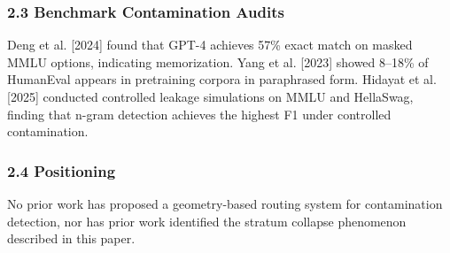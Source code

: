 \subsubsection{2.3 Benchmark Contamination Audits}

Deng et al. [2024] found that GPT-4 achieves 57\% exact match on masked MMLU options, indicating memorization. Yang et al. [2023] showed 8–18\% of HumanEval appears in pretraining corpora in paraphrased form. Hidayat et al. [2025] conducted controlled leakage simulations on MMLU and HellaSwag, finding that n-gram detection achieves the highest F1 under controlled contamination.

\subsubsection{2.4 Positioning}

No prior work has proposed a geometry-based routing system for contamination detection, nor has prior work identified the stratum collapse phenomenon described in this paper.

